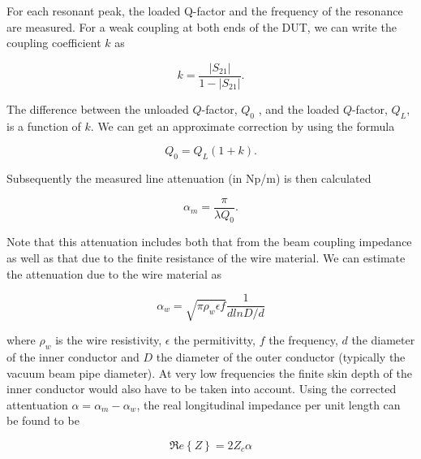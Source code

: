 For each resonant peak, the loaded Q-factor and the frequency of the resonance are measured. For a weak coupling at both ends of the DUT, we can write the coupling coefficient $k$ as

\begin{equation}
k = \frac{\left| S_{21} \right|}{1 - \left| S_{21} \right| }.
\label{eqn:coupling_coeff}
\end{equation}

The difference between the unloaded $Q$-factor, $Q_{0}$ , and the loaded $Q$-factor, $Q_{L}$, is a function of $k$. We can get an approximate correction by using the formula

\begin{equation}
Q_{0} = Q_{L} \left( 1 + k  \right).
\label{eqn:Q_correc}
\end{equation}

Subsequently the measured line attenuation (in Np/m) is then calculated

\begin{equation}
\alpha_{m} = \frac{\pi}{\lambda Q_{0}}.
\label{eqn:atten}
\end{equation}

Note that this attenuation includes both that from the beam coupling impedance as well as that due to the finite resistance of the wire material. We can estimate the attenuation due to the wire material as

\begin{equation}
\alpha_{w} = \sqrt{\pi \rho_{w} \epsilon f} \frac{1}{d ln D/d}
\label{eqn:wire_atten}
\end{equation}

where $\rho_{w}$ is the wire resistivity, $\epsilon$ the permitivitty, $f$ the frequency, $d$ the diameter of the inner conductor and $D$ the diameter of the outer conductor (typically the vacuum beam pipe diameter). At very low frequencies the finite skin depth of the inner conductor would also have to be taken into account. Using the corrected attentuation $\alpha = \alpha_{m} - \alpha_{w}$, the real longitudinal impedance per unit length can be found to be 

\begin{equation}
\Re e\left\{ Z \right\} = 2Z_{c} \alpha
\label{eqn:res_imp}
\end{equation}

